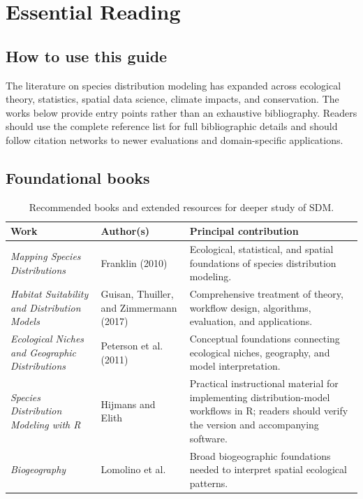 \chapter{Essential Reading}

\section*{How to use this guide}

The literature on species distribution modeling has expanded across ecological theory, statistics, spatial data science, climate impacts, and conservation. The works below provide entry points rather than an exhaustive bibliography. Readers should use the complete reference list for full bibliographic details and should follow citation networks to newer evaluations and domain-specific applications.

\section{Foundational books}

\begin{table}[H]
\centering
\caption{Recommended books and extended resources for deeper study of SDM.}
\label{tab:livros_sdm}
\small
\setlength{\tabcolsep}{3pt}
\begin{tabular}{p{}p{}p{}}
\toprule
\textbf{Work} & \textbf{Author(s)} & \textbf{Principal contribution} \\
\midrule
\textit{Mapping Species Distributions} & Franklin (2010) & Ecological, statistical, and spatial foundations of species distribution modeling. \\
\textit{Habitat Suitability and Distribution Models} & Guisan, Thuiller, and Zimmermann (2017) & Comprehensive treatment of theory, workflow design, algorithms, evaluation, and applications. \\
\textit{Ecological Niches and Geographic Distributions} & Peterson et al. (2011) & Conceptual foundations connecting ecological niches, geography, and model interpretation. \\
\textit{Species Distribution Modeling with R} & Hijmans and Elith & Practical instructional material for implementing distribution-model workflows in R; readers should verify the version and accompanying software. \\
\textit{Biogeography} & Lomolino et al. & Broad biogeographic foundations needed to interpret spatial ecological patterns. \\
\bottomrule
\end{tabular}
\end{table}

